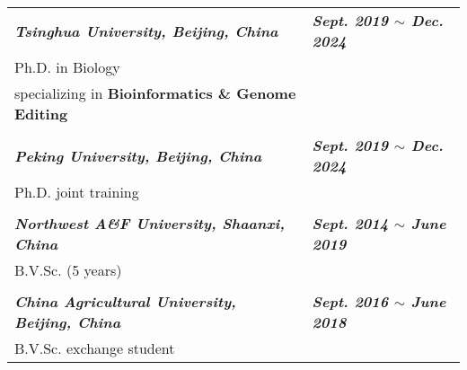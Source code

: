 

\begin{longtable}{p{} p{}}
    \textit{\textbf{Tsinghua University, Beijing, China}} & \textit{\textbf{Sept. 2019 $\sim$ Dec. 2024\footnotemark[1]}} \\
    Ph.D. in Biology &  \\
    specializing in \textbf{Bioinformatics \& Genome Editing} & \\
    & \\
    \textit{\textbf{Peking University, Beijing, China}} & \textit{\textbf{Sept. 2019 $\sim$ Dec. 2024\footnotemark[1]}} \\
    Ph.D. joint training &  \\
    & \\
    \textit{\textbf{Northwest A\&F University, Shaanxi, China}} & \textit{\textbf{Sept. 2014 $\sim$ June 2019}} \\
    B.V.Sc. (5 years) & \\
    & \\
    \textit{\textbf{China Agricultural University, Beijing, China}} & \textit{\textbf{Sept. 2016 $\sim$ June 2018}} \\
    B.V.Sc. exchange student &  \\
\end{longtable}



